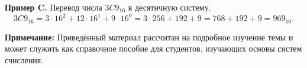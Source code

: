 \documentclass[12pt,a4paper]{article}
\begin{document}
\textbf{Пример C.} Перевод числа \(3C9_{16}\) в десятичную систему.
\[
3C9_{16} = 3\cdot16^2 + 12\cdot16^1 + 9\cdot16^0 = 3\cdot256 + 192 + 9 = 768 + 192 + 9 = 969_{10}.
\]

\vfill
\textbf{Примечание:} Приведённый материал рассчитан на подробное изучение темы и может служить как справочное пособие для студентов, изучающих основы систем счисления.
\end{document}
